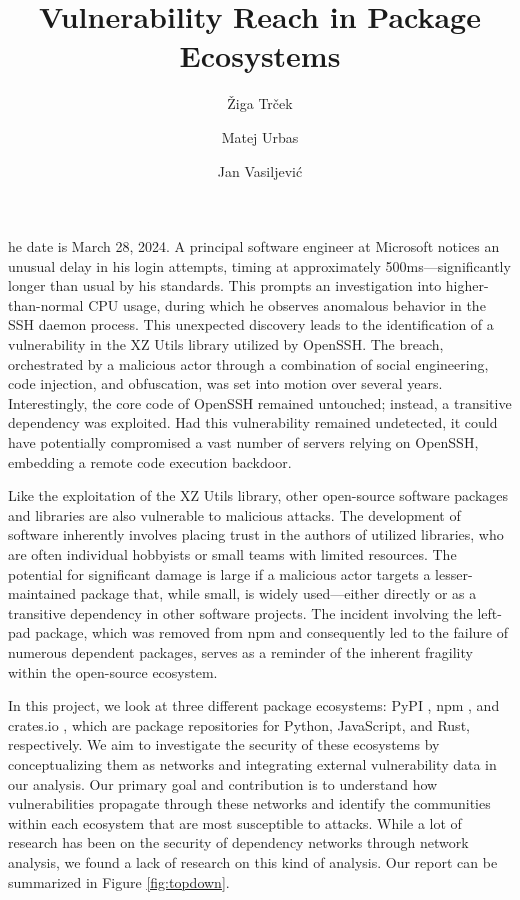 \documentclass[9pt,twocolumn,twoside]{pnas-report}
\title{Vulnerability Reach in Package Ecosystems}
\author[a]{Žiga Trček}
\author[a]{Matej Urbas}
\author[a]{Jan Vasiljević}
\affil[a]{University of Ljubljana, Faculty of Computer and Information Science, Ve\v{c}na pot 113, SI-1000 Ljubljana, Slovenia}
\begin{document}
\maketitle
\thispagestyle{firststyle}

he date is March 28, 2024. A principal software engineer at Microsoft notices an unusual delay in his login attempts, timing at approximately 500ms—significantly longer than usual by his standards.
This prompts an investigation into higher-than-normal CPU usage, during which he observes anomalous behavior in the SSH daemon process.
This unexpected discovery leads to the identification of a vulnerability in the XZ Utils library utilized by OpenSSH.
The breach, orchestrated by a malicious actor through a combination of social engineering, code injection, and obfuscation, was set into motion over several years.
Interestingly, the core code of OpenSSH remained untouched; instead, a transitive dependency was exploited.
Had this vulnerability remained undetected, it could have potentially compromised a vast number of servers relying on OpenSSH, embedding a remote code execution backdoor.


Like the exploitation of the XZ Utils library, other open-source software packages and libraries are also vulnerable to malicious attacks.
The development of software inherently involves placing trust in the authors of utilized libraries, who are often individual hobbyists or small teams with limited resources.
The potential for significant damage is large if a malicious actor targets a lesser-maintained package that, while small, is widely used—either directly or as a transitive dependency in other software projects.
The incident involving the left-pad package, which was removed from npm and consequently led to the failure of numerous dependent packages, serves as a reminder of the inherent fragility within the open-source ecosystem.

In this project, we look at three different package ecosystems: PyPI \cite{pypi}, npm \cite{NPM}, and crates.io \cite{crates}, which are package repositories for Python, JavaScript, and Rust, respectively.
We aim to investigate the security of these ecosystems by conceptualizing them as networks and integrating external vulnerability data in our analysis.
Our primary goal and contribution is to understand how vulnerabilities propagate through these networks and identify the communities within each ecosystem that are most susceptible to attacks.
While a lot of research has been on the security of dependency networks through network analysis,
we found a lack of research on this kind of analysis.
Our report can be summarized in Figure \ref{fig:topdown}.
\end{document}
